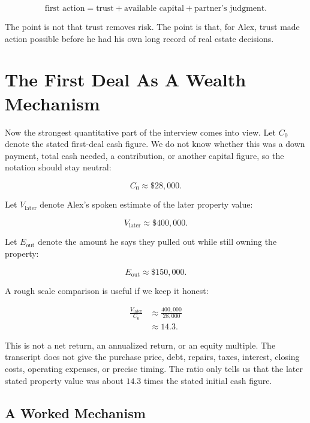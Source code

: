 \begin{equation}
\text{first action}
=
\text{trust}
+
\text{available capital}
+
\text{partner's judgment}.
\end{equation}

The point is not that trust removes risk. The point is that, for Alex, trust made action possible before he had his own long record of real estate decisions.

\section{The First Deal As A Wealth Mechanism}

Now the strongest quantitative part of the interview comes into view. Let \(C_0\) denote the stated first-deal cash figure. We do not know whether this was a down payment, total cash needed, a contribution, or another capital figure, so the notation should stay neutral:

\begin{equation}
C_0 \approx \$28{,}000.
\end{equation}

Let \(V_{\text{later}}\) denote Alex's spoken estimate of the later property value:

\begin{equation}
V_{\text{later}} \approx \$400{,}000.
\end{equation}

Let \(E_{\text{out}}\) denote the amount he says they pulled out while still owning the property:

\begin{equation}
E_{\text{out}} \approx \$150{,}000.
\end{equation}

A rough scale comparison is useful if we keep it honest:

\begin{align}
\frac{V_{\text{later}}}{C_0}
&\approx
\frac{400{,}000}{28{,}000} \\
&\approx 14.3.
\end{align}

This is not a net return, an annualized return, or an equity multiple. The transcript does not give the purchase price, debt, repairs, taxes, interest, closing costs, operating expenses, or precise timing. The ratio only tells us that the later stated property value was about \(14.3\) times the stated initial cash figure.

\subsection{A Worked Mechanism}

